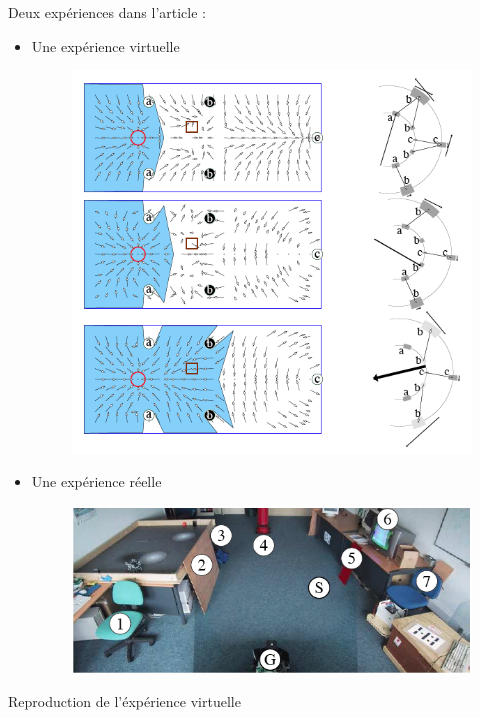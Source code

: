 \documentclass{beamer}
\begin{document}
\begin{frame}
  Deux expériences dans l'article :
  \begin{itemize}
    \item Une expérience virtuelle
    \begin{figure}
      \centering
      \includegraphics[scale=0.2]{Exp-virtuel.png}
    \end{figure}
    \item Une expérience réelle
    \begin{figure}
      \centering
      \includegraphics[scale=0.2]{Exp-real.png}
    \end{figure}
  \end{itemize}
  Reproduction de l'éxpérience virtuelle
\end{frame}
\end{document}
